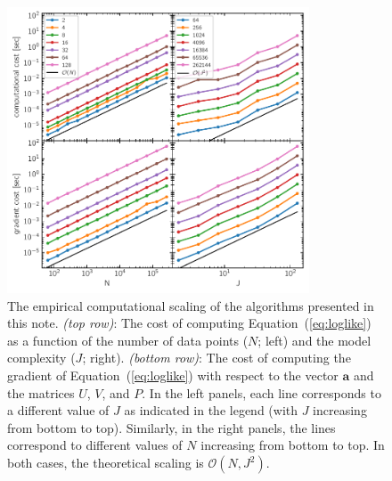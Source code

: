 \documentclass[rnaas]{aastex62}
\newcommand{\figurelabel}[1]{\label{fig:#1}}
\renewcommand{\eqref}[1]{\ref{eq:#1}}
\newcommand{\Eq}[1]{Equation~(\eqref{#1})}
\newcommand{\eq}[1]{\Eq{#1}}
\newcommand{\bvec}[1]{{\ensuremath{\boldsymbol{#1}}}}
\begin{document}
\begin{figure}[htbp]
\begin{center}
\includegraphics[width=0.8\textwidth]{figure.pdf}
\caption{%
    The empirical computational scaling of the algorithms presented in this
    note.
    \emph{(top row)}: The cost of computing \eq{loglike} as a
    function of the number of data points ($N$; left) and the model complexity
    ($J$; right).
    \emph{(bottom row)}: The cost of computing the gradient of \eq{loglike}
    with respect to the vector $\bvec{a}$ and the matrices $U$, $V$, and $P$.
    In the left panels, each line corresponds to a different value of $J$ as
    indicated in the legend (with $J$ increasing from bottom to top).
    Similarly, in the right panels, the lines correspond to different values
    of $N$ increasing from bottom to top.
    In both cases, the theoretical scaling is $\mathcal{O}(N,J^2)$.
\figurelabel{figure}}
\end{center}
\end{figure}



\end{document}
